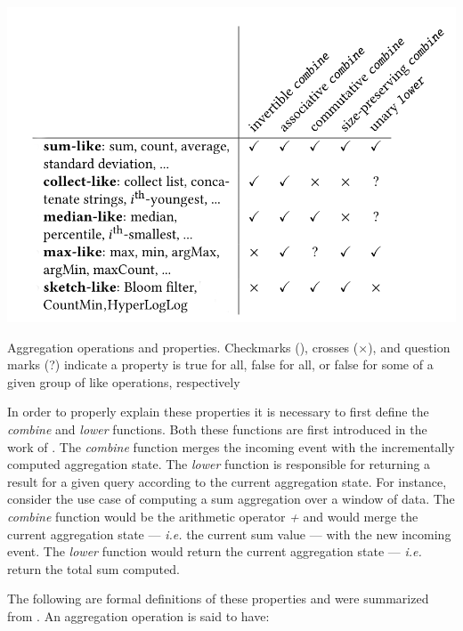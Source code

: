 \begin{table}[!htb]
    \begin{center}
      \includegraphics[scale=0.5]{figures/aggregation-operations-properties.png}
      \caption[Aggregation operations and properties]{Aggregation operations and properties. Checkmarks (\checkmark), crosses ($\times$), and question marks (?) indicate a property is true for all, false for all, or false for some of a given group of like operations, respectively}
      \label{tbl:aggregations-properties}
    \end{center}
\end{table}


In order to properly explain these properties it is necessary to first define the \textit{combine} and \textit{lower} functions. Both these functions are first introduced in the work of \cite{Tangwongsan-Sliding-Window-Aggregation-Algorithms}. The \textit{combine} function merges the incoming event with the incrementally computed aggregation state. The \textit{lower} function is responsible for returning a result for a given query according to the current aggregation state. For instance, consider the use case of computing a sum aggregation over a window of data. The \textit{combine} function would be the arithmetic operator \textit{+} and would merge the current aggregation state --- \textit{i.e.} the current sum value --- with the new incoming event. The \textit{lower} function would return the current aggregation state --- \textit{i.e.} return the total sum computed.

The following are formal definitions of these properties and were summarized from \cite{Tangwongsan-Sliding-Window-Aggregation-Algorithms}. An aggregation operation is said to have:


